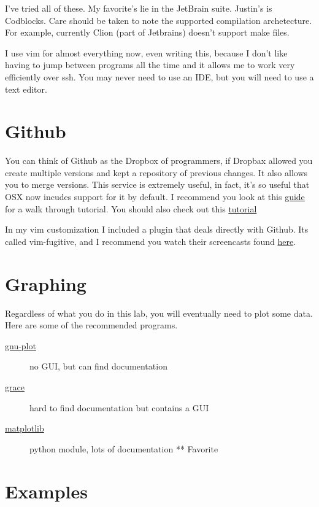 \documentclass{article}
\begin{document}
I've tried all of these. 
My favorite's lie in the JetBrain suite. 
Justin's is Codblocks. 
Care should be taken to note the supported compilation archetecture. 
For example, currently Clion (part of Jetbrains) doesn't support make files.

I use vim for almost everything now, even writing this, because I don't like having to jump between programs all the time and it allows me to work very efficiently over ssh.
You may never need to use an IDE, but you will need to use a text editor.

\section*{Github}
You can think of Github as the Dropbox of programmers, if Dropbax allowed you create multiple versions and kept a repository of previous changes.
It also allows you to merge versions.
This service is extremely useful, in fact, it's so useful that OSX now incudes support for it by default.
I recommend you look at this \href{https://githowto.com/}{guide} for a walk through tutorial.
You should also check out this \href{https://www.atlassian.com/git/tutorials/}{tutorial}

In my vim customization I included a plugin that deals directly with Github.
Its called vim-fugitive, and I recommend you watch their screencasts found \href{https://github.com/tpope/vim-fugitive}{here}.


\section*{Graphing}

Regardless of what you do in this lab, you will eventually need to plot some data.
Here are some of the recommended programs.

\begin{description}
  \item[\href{http://alvinalexander.com/technology/gnuplot-charts-graphs-examples}{gnu-plot}] no GUI, but can find documentation
  \item[\href{http://www.phy.ohiou.edu/~elster/phys5071/extras/xmgrace\_tutorial.pdf}{grace}] hard to find documentation but contains a GUI
  \item[\href{http://matplotlib.org/}{matplotlib}] python module, lots of documentation ** Favorite
\end{description} 

\section*{Examples}
\end{document}

